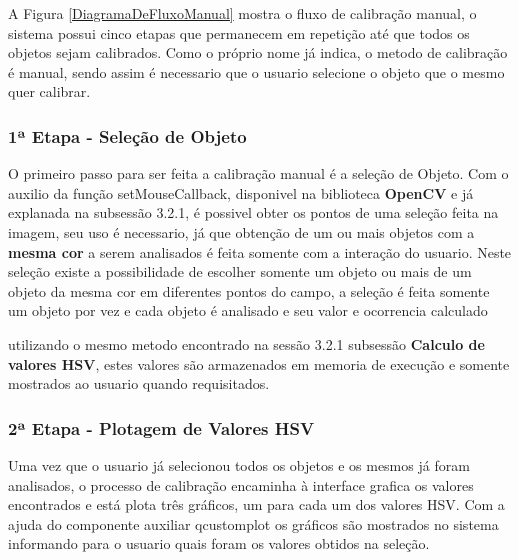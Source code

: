   	  			
   A Figura \ref{DiagramaDeFluxoManual} mostra o fluxo de calibração manual, o sistema possui cinco etapas que permanecem em repetição até que todos os objetos sejam calibrados. Como o próprio nome já indica, o metodo de calibração é manual, sendo assim é necessario que o usuario selecione o objeto que o mesmo quer calibrar.
	
  	\subsubsection{1ª Etapa - Seleção de Objeto}	
  	O primeiro passo para ser feita a calibração manual é a seleção de Objeto. Com o auxilio da função setMouseCallback, disponivel na biblioteca \textbf{OpenCV} e já explanada na subsessão 3.2.1, é possivel obter os pontos de uma seleção feita na imagem, seu uso é necessario, já que obtenção de um ou mais objetos com a \textbf{mesma cor} a serem analisados é feita somente com a interação do usuario. Neste seleção existe a possibilidade de escolher somente um objeto ou mais de um objeto da mesma cor em diferentes pontos do campo, a seleção é feita somente um objeto por vez e cada objeto é analisado e seu valor e ocorrencia calculado 
  	
  	utilizando o mesmo metodo encontrado na sessão 3.2.1 subsessão \textbf{Calculo de valores HSV}, estes valores são armazenados em memoria de execução e somente mostrados ao usuario quando requisitados. 
  	
  	\subsubsection{2ª Etapa - Plotagem de Valores HSV}	
  	Uma vez que o usuario já selecionou todos os objetos e os mesmos já foram analisados, o processo de calibração encaminha à interface grafica os valores encontrados e está plota três gráficos, um para cada um dos valores HSV.
  	Com a ajuda do componente auxiliar qcustomplot os gráficos são mostrados no sistema informando para o usuario quais foram os valores obtidos na seleção.
  	
